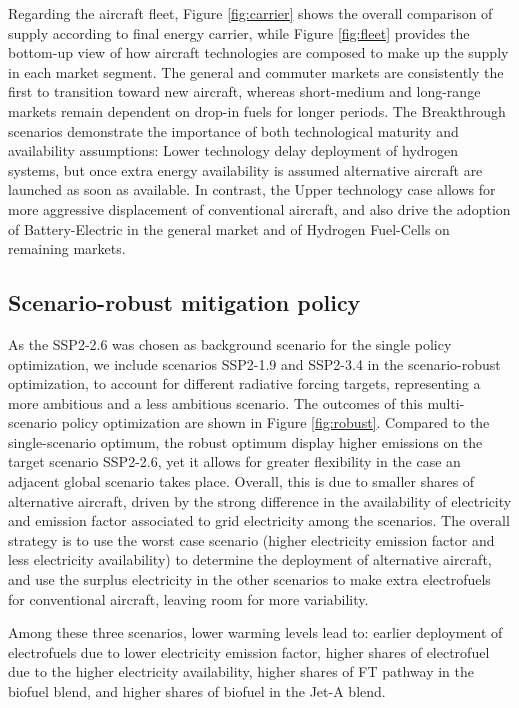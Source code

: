 \documentclass[a4paper,fleqn]{cas-dc}
\begin{document}
Regarding the aircraft fleet, Figure \ref{fig:carrier} shows the overall comparison of supply according to final energy carrier, while Figure \ref{fig:fleet} provides the bottom-up view of how aircraft technologies are composed to make up the supply in each market segment. The general and commuter markets are consistently the first to transition toward new aircraft, whereas short-medium and long-range markets remain dependent on drop-in fuels for longer periods. The Breakthrough scenarios demonstrate the importance of both technological maturity and availability assumptions: Lower technology delay deployment of hydrogen systems, but once extra energy availability is assumed alternative aircraft are launched as soon as available. In contrast, the Upper technology case allows for more aggressive displacement of conventional aircraft, and also drive the adoption of Battery-Electric in the general market and of Hydrogen Fuel-Cells on remaining markets.

\subsection{Scenario-robust mitigation policy}

As the SSP2-2.6 was chosen as background scenario for the single policy optimization, we include scenarios SSP2-1.9 and SSP2-3.4 in the scenario-robust optimization, to account for different radiative forcing targets, representing a more ambitious and a less ambitious scenario. The outcomes of this multi-scenario policy optimization are shown in Figure \ref{fig:robust}. Compared to the single-scenario optimum, the robust optimum display higher emissions on the target scenario SSP2-2.6, yet it allows for greater flexibility in the case an adjacent global scenario takes place. Overall, this is due to smaller shares of alternative aircraft, driven by the strong difference in the availability of electricity and emission factor associated to grid electricity among the scenarios. The overall strategy is to use the worst case scenario (higher electricity emission factor and less electricity availability) to determine the deployment of alternative aircraft, and use the surplus electricity in the other scenarios to make extra electrofuels for conventional aircraft, leaving room for more variability.

Among these three scenarios, lower warming levels lead to: earlier deployment of electrofuels due to lower electricity emission factor, higher shares of electrofuel due to the higher electricity availability, higher shares of FT pathway in the biofuel blend, and higher shares of biofuel in the Jet-A blend.
\end{document}
